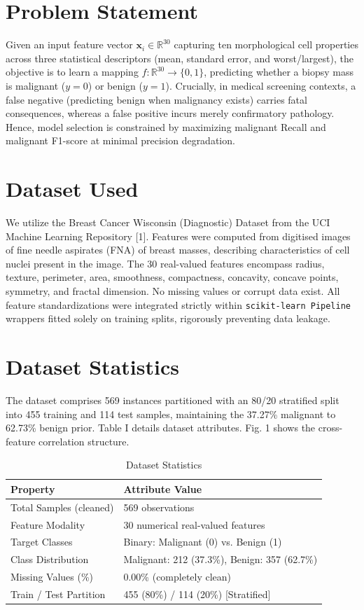 \documentclass[conference]{IEEEtran}
\begin{document}
\section{Problem Statement}
Given an input feature vector $\mathbf{x}_i \in \mathbb{R}^{30}$ capturing ten morphological cell properties across three statistical descriptors (mean, standard error, and worst/largest), the objective is to learn a mapping $f: \mathbb{R}^{30} \to \{0, 1\}$, predicting whether a biopsy mass is malignant ($y=0$) or benign ($y=1$). Crucially, in medical screening contexts, a false negative (predicting benign when malignancy exists) carries fatal consequences, whereas a false positive incurs merely confirmatory pathology. Hence, model selection is constrained by maximizing malignant Recall and malignant F1-score at minimal precision degradation.

\section{Dataset Used}
We utilize the Breast Cancer Wisconsin (Diagnostic) Dataset from the UCI Machine Learning Repository [1]. Features were computed from digitised images of fine needle aspirates (FNA) of breast masses, describing characteristics of cell nuclei present in the image. The 30 real-valued features encompass radius, texture, perimeter, area, smoothness, compactness, concavity, concave points, symmetry, and fractal dimension. No missing values or corrupt data exist. All feature standardizations were integrated strictly within \texttt{scikit-learn Pipeline} wrappers fitted solely on training splits, rigorously preventing data leakage.

\section{Dataset Statistics}
The dataset comprises 569 instances partitioned with an 80/20 stratified split into 455 training and 114 test samples, maintaining the 37.27\% malignant to 62.73\% benign prior. Table I details dataset attributes. Fig. 1 shows the cross-feature correlation structure.

\begin{table}[htbp]
\caption{Dataset Statistics}
\begin{center}
\begin{tabular}{ll}
\toprule
\textbf{Property} & \textbf{Attribute Value} \\
\midrule
Total Samples (cleaned) & 569 observations \\
Feature Modality & 30 numerical real-valued features \\
Target Classes & Binary: Malignant (0) vs. Benign (1) \\
Class Distribution & Malignant: 212 (37.3\%), Benign: 357 (62.7\%) \\
Missing Values (\%) & 0.00\% (completely clean) \\
Train / Test Partition & 455 (80\%) / 114 (20\%) [Stratified] \\
\bottomrule
\end{tabular}
\end{center}
\end{table}
\end{document}

